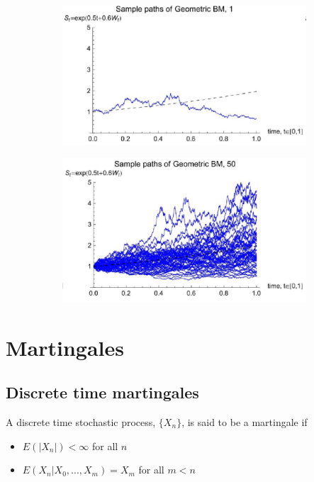 \documentclass[11pt,a4paper]{book}
\theoremstyle{definition}\newtheorem{definition}{Definition}
\theoremstyle{definition}\newtheorem{fact}{Fact}
\theoremstyle{definition}\newtheorem{remark}{Remark}
\theoremstyle{definition}\newtheorem{ex}{Ex.}
\theoremstyle{definition}\newtheorem{project}{Project}
\theoremstyle{definition}\newtheorem{problem}{Problem}
\theoremstyle{definition}\newtheorem{example}{Example}
\numberwithin{theorem}{section}
\numberwithin{corollary}{chapter}
\numberwithin{assumption}{chapter}
\numberwithin{definition}{chapter}
\numberwithin{prop}{chapter}
\numberwithin{notation}{chapter}
\numberwithin{problem}{chapter}
\numberwithin{example}{chapter}
\numberwithin{fact}{chapter}
\numberwithin{ex}{chapter}
\begin{document}
\begin{figure}[H]
	\begin{subfigure}{0.5\textwidth}
		\centering
		\includegraphics[scale=0.5]{Chapter01/Chapter1_6.png}
	\end{subfigure}
	\begin{subfigure}{0.5\textwidth}
		\centering
		\includegraphics[scale=0.5]{Chapter01/Chapter1_7.png}
	\end{subfigure}
\end{figure}

\section{Martingales}

\subsection{Discrete time martingales}
A discrete time stochastic process, $\{X_n\}$, is said to be a martingale if
\begin{itemize}
\item $E(|X_n|) < \infty$ for all $n$
\item $E(X_n | X_0, ..., X_m) = X_m$ for all $m<n$
\end{itemize}
\end{document}
